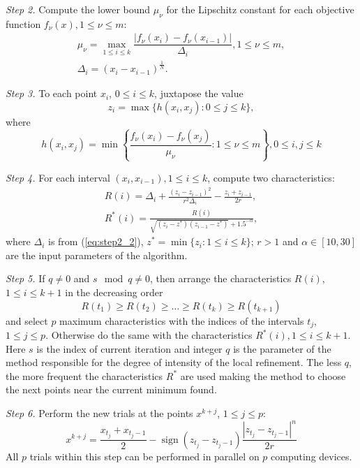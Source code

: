 \documentclass{llncs}
\DeclareMathOperator{\sign}{sign}
\begin{document}
\textit{Step 2.} Compute the lower bound \(\mu_\nu\) for the Lipschitz constant for each
objective function \(f_\nu(x),1\leqslant\nu\leqslant m\):
\begin{gather}
\label{eq:step2_1}
\mu_\nu=\max_{1\leqslant i\leqslant k}\dfrac{|f_\nu(x_i)-f_\nu(x_{i-1})|}{\Delta_i}, 1\leqslant
\nu\leqslant m, \\
\label{eq:step2_2}
\Delta_i=(x_i-x_{i-1})^\frac{1}{N}.
\end{gather}

\textit{Step 3.} To each point \(x_i\), \(0\leqslant i\leqslant k\), juxtapose the value
\begin{equation}
  z_i=\max\{h(x_i,x_j):0\leqslant j\leqslant k\},
\end{equation}
where
\begin{equation}
  h(x_i,x_j)=\min \left\{ \frac{f_\nu(x_i)-f_\nu(x_j)}{\mu_\nu}:1\leqslant \nu\leqslant m \right\}, 0\leqslant
i,j\leqslant k
\end{equation}

\textit{Step 4.} For each interval \((x_i,x_{i-1}),1\leqslant i\leqslant k\), compute two
characteristics:
\begin{eqnarray}
  R(i) = \Delta_i + \frac{(z_i-z_{i-1})^2}{r^2\Delta_i}-\frac{z_i+z_{i-1}}{2r}, \\
  R^*(i)=\frac{R(i)}{\sqrt{(z_i-z^*)(z_{i-1}-z^*)} + 1.5^{-\alpha}},
\end{eqnarray}
where \(\Delta_i\) is from (\ref{eq:step2_2}), \(z^*=\min\{z_i:1\leqslant i\leqslant k\}\); \(r>1\) and
\(\alpha\in [10,30]\) are the input parameters of the algorithm.

\textit{Step 5.} If \(q\not=0\) and \(s \mod q\not=0 \), then arrange the characteristics \(R(i)\),
\(1 \leqslant i \leqslant k + 1\) in the decreasing order
\begin{equation*}
  R(t_1) \geqslant R(t_2) \geqslant \dots \geqslant R(t_k) \geqslant R(t_{k+1})
\end{equation*}
and select \(p\) maximum characteristics with the indices of the intervals \(t_j\), \(1 \leqslant j
\leqslant p\). Otherwise do the same with the characteristics \(R^*(i),1\leqslant i\leqslant k+1\).
Here \(s\) is the index of current iteration and integer \(q\) is the parameter of the method responsible
for the degree of intensity of the local refinement. The less \(q\), the more frequent the
characteristics \(R^*\) are used making the method to choose the next points near the current
minimum found.

\textit{Step 6.} Perform the new trials at the points \(x^{k+j}\), \(1 \leqslant j \leqslant p\):
\begin{equation}
  x^{k+j}=\frac{x_{t_j}+x_{t_j-1}}{2} - \sign(z_{t_j} - z_{t_j-1})\frac{|z_{t_j} - z_{t_j-
1}|^n}{2r}
\end{equation}
All \(p\) trials within this step can be performed in parallel on \(p\) computing devices.
\end{document}
